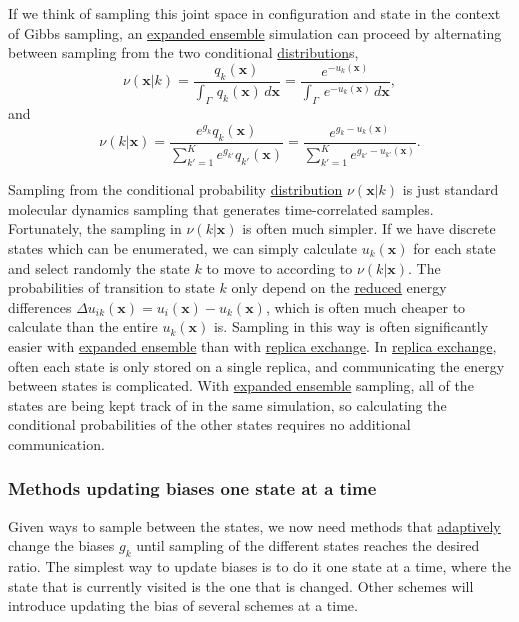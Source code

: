 \documentclass[9pt,review]{livecoms}
\newcommand{\vx}{\mathbf{x}}
\begin{document}
If we think of sampling this joint space in configuration and state in the context of Gibbs sampling, an \hyperlink{ref:ExpEns} {expanded ensemble} simulation can proceed by alternating between sampling from the two conditional \hyperlink{ref:Distribution} {distribution}s,
\begin{equation}
\nu(\vx | k) = \frac{q_k(\vx)}{\int_\Gamma  \, q_k(\vx) \, d\vx}  = \frac{e^{-u_k(\vx)}}{\int_\Gamma  \, e^{-u_k(\vx)} \, d\vx },
\label{equation:expanded-ensemble-gibbs-update_1}
\end{equation}
and
\begin{equation}
\nu(k | \vx) = \frac{e^{g_k}q_k(\vx)}{\sum\limits_{k'=1}^K e^{g_{k'}}q_{k'}(\vx)} = \frac{e^{g_k - u_k(\vx)}}{\sum\limits_{k'=1}^K e^{g_{k'} - u_{k'}(\vx)}}.
\label{equation:expanded-ensemble-gibbs-update_2}
\end{equation}

Sampling from the conditional probability \hyperlink{ref:Distribution} {distribution}
$\nu(\vx | k)$ is just standard molecular dynamics sampling that generates time-correlated samples. Fortunately, the sampling in $\nu(k | \vx)$ is often much simpler.   If we have
discrete states which can be enumerated, we can simply calculate
$u_k(\vx)$ for each state and select randomly the state $k$ to move to according to $\nu(k|\vx)$.  The
probabilities of transition to state $k$ only depend on the \hyperlink{ref:reduced} {reduced} energy differences $\Delta
u_{ik}(\vx) = u_i(\vx) - u_k(\vx)$, which is often much cheaper to calculate
than the entire $u_k(\vx)$ is. Sampling in this way is often significantly easier with \hyperlink{ref:ExpEns} {expanded ensemble} than with \hyperlink{ref:ReplEx} {replica exchange}. In \hyperlink{ref:ReplEx} {replica exchange}, often each state is only stored on a single replica, and communicating the energy between states is complicated. With \hyperlink{ref:ExpEns} {expanded ensemble} sampling, all of the states are being kept track of in the same simulation, so calculating the conditional probabilities of the other states requires no additional communication.

\subsubsection{\label{sec:singlestate} Methods updating biases one state at a time}
Given ways to sample between the states, we now need methods that \hyperlink{ref:Adaptive} {adaptively} change the biases $g_k$ until sampling of the different states reaches the desired ratio. The simplest way to update biases is to do it one state at a time, where the state that is currently visited is the one that is changed. Other schemes will introduce updating the bias of several schemes at a time.
\end{document}
